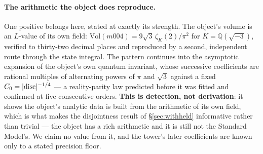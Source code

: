\documentclass[11pt,a4paper]{article}
\theoremstyle{definition}
\theoremstyle{remark}
\newcommand{\Q}{\mathbb{Q}}
\begin{document}
\paragraph{The arithmetic the object does reproduce.} One positive belongs here, stated at exactly its
strength. The object's volume is an $L$-value of its own field: $\mathrm{Vol}(m004) = 9\sqrt3\,\zeta_K(2)/\pi^2$ for
$K = \Q(\sqrt{-3})$, verified to thirty-two decimal places and reproduced by a second, independent route through the
state integral. The pattern continues into the asymptotic expansion of the object's own quantum invariant, whose
successive coefficients are rational multiples of alternating powers of $\pi$ and $\sqrt3$ against a fixed
$C_0 = |{\rm disc}|^{-1/4}$ --- a reality-parity law predicted before it was fitted and confirmed at five consecutive
orders. \textbf{This is detection, not derivation}: it shows the object's analytic data is built from the arithmetic
of its own field, which is what makes the disjointness result of \S\ref{sec:withheld} informative rather than trivial ---
the object has a rich arithmetic and it is still not the Standard Model's. We claim no value from it, and the tower's
later coefficients are known only to a stated precision floor.
\end{document}
